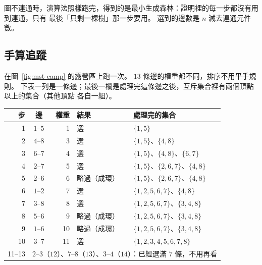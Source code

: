 圖不連通時，演算法照樣跑完，得到的是最小生成森林：證明裡的每一步都沒有用到連通，只有
最後「只剩一棵樹」那一步要用。 選到的邊數是 $n$ 減去連通元件數。

\subsection{手算追蹤}

在圖~\ref{fig:mst-camp} 的露營區上跑一次。 $13$ 條邊的權重都不同，排序不用平手規則。
下表一列是一條邊；最後一欄是處理完這條邊之後，互斥集合裡有兩個頂點以上的集合（其他頂點
各自一組）。

\begin{center}
\small
\begin{tabular}{rcrll}
\toprule
步 & 邊 & 權重 & 結果 & 處理完的集合 \\
\midrule
1 & $1$--$5$ & 1 & 選 & $\{1, 5\}$ \\
2 & $4$--$8$ & 3 & 選 & $\{1, 5\}$、$\{4, 8\}$ \\
3 & $6$--$7$ & 4 & 選 & $\{1, 5\}$、$\{4, 8\}$、$\{6, 7\}$ \\
4 & $2$--$7$ & 5 & 選 & $\{1, 5\}$、$\{2, 6, 7\}$、$\{4, 8\}$ \\
5 & $2$--$6$ & 6 & 略過（成環） & $\{1, 5\}$、$\{2, 6, 7\}$、$\{4, 8\}$ \\
6 & $1$--$2$ & 7 & 選 & $\{1, 2, 5, 6, 7\}$、$\{4, 8\}$ \\
7 & $3$--$8$ & 8 & 選 & $\{1, 2, 5, 6, 7\}$、$\{3, 4, 8\}$ \\
8 & $5$--$6$ & 9 & 略過（成環） & $\{1, 2, 5, 6, 7\}$、$\{3, 4, 8\}$ \\
9 & $1$--$6$ & 10 & 略過（成環） & $\{1, 2, 5, 6, 7\}$、$\{3, 4, 8\}$ \\
10 & $3$--$7$ & 11 & 選 & $\{1, 2, 3, 4, 5, 6, 7, 8\}$ \\
11--13 & \multicolumn{4}{l}{$2$--$3$（$12$）、$7$--$8$（$13$）、$3$--$4$（$14$）：已經選滿 $7$ 條，不用再看} \\
\bottomrule
\end{tabular}
\end{center}

